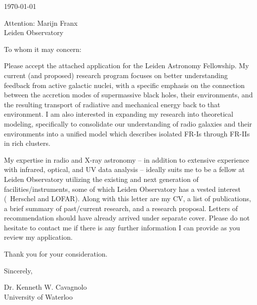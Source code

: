 \documentclass[12pt]{article}
\begin{document}
\today

Attention: Marijn Franx\\
Leiden Observatory

To whom it may concern:

Please accept the attached application for the Leiden Astronomy
Fellowship. My current (and proposed) research program focuses on
better understanding feedback from active galactic nuclei, with a
specific emphasis on the connection between the accretion modes of
supermassive black holes, their environments, and the resulting
transport of radiative and mechanical energy back to that environment.
I am also interested in expanding my research into theoretical
modeling, specifically to consolidate our understanding of radio
galaxies and their environments into a unified model which describes
isolated FR-Is through FR-IIs in rich clusters.

My expertise in radio and X-ray astronomy -- in addition to extensive
experience with infrared, optical, and UV data analysis -- ideally
suits me to be a fellow at Leiden Observatory utilizing the existing
and next generation of facilities/instruments, some of which Leiden
Observatory has a vested interest (\ie\ Herschel and LOFAR). Along
with this letter are my CV, a list of publications, a brief summary of
past/current research, and a research proposal. Letters of
recommendation should have already arrived under separate
cover. Please do not hesitate to contact me if there is any further
information I can provide as you review my application.

Thank you for your consideration.

Sincerely,\\
\begin{minipage}{7.5in}
\end{minipage}
Dr. Kenneth W. Cavagnolo\\
University of Waterloo
\end{document}
